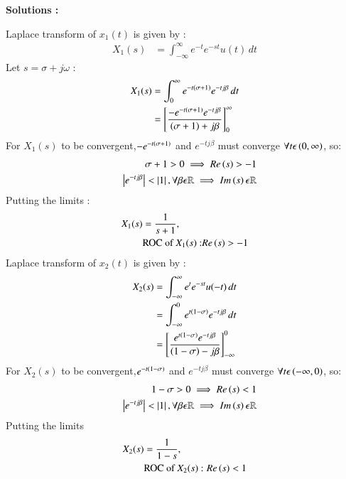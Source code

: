 \documentclass[journal,12pt,onecolumn]{IEEEtran}
\theoremstyle{remark}
\begin{document}
\textbf{Solutions :}
    
Laplace transform of $x_1(t)$ is given by :
\begin{align}
    X_1(s) &=  \int_{-\infty}^{\infty} e^{-t}e^{-st}u(t) \,dt
    \end{align}
    Let $s=\sigma+j\omega$ :
\begin{align}
 X_1(s) &= \int_{0}^{\infty}e^{-t\left(\sigma+1\right)}e^{-tj\beta} \,dt\\
       &=  \left[\frac{-e^{-t\left(\sigma+1\right)}e^{-tj\beta}}{\left(\sigma+1\right)+j\beta}\right]_{0}^{\infty}  \\
       \end{align}
        For $X_1(s)$ to be convergent,$-e^{-t\left(\sigma+1\right)}$ and $e^{-tj\beta}$ must converge $\forall t \epsilon \left(0,\infty\right)$, so:
        \begin{align}
\sigma + 1 > 0 \implies  Re\left(s\right)>-1 \\  \quad\left\vert e^{-tj\beta}\right\vert < \left\vert1\right\vert, \forall \beta \epsilon \mathbb{R} \implies Im\left(s\right) \epsilon \mathbb{R}
        \end{align}
Putting the limits :
       \begin{align}
X_1(s)&= \frac{1}{s+1} , \\ &\text{ROC of $X_1(s)$ :} Re\left(s\right) > -1
\end{align}
Laplace transform of $x_2(t)$ is given by :
\begin{align}
    X_2(s) &=  \int_{-\infty}^{\infty} e^{t}e^{-st}u(-t) \,dt\\
    &= \int_{-\infty}^{0}e^{t\left(1-\sigma\right)}e^{-tj\beta} \,dt\\
      &=  \left[\frac{e^{t\left(1-\sigma\right)}e^{-tj\beta}}{\left(1-\sigma\right)-j\beta}\right]_{-\infty}^{0}  
     \end{align}
      For $X_2(s)$ to be convergent,$e^{-t\left(1-\sigma\right)}$ and $e^{-tj\beta}$ must converge $\forall t\epsilon\left(-\infty,0\right)$, so:
     \begin{align}
1-\sigma > 0 \implies  Re\left(s\right) < 1 \\  \quad\left\vert e^{-tj\beta}\right\vert < \left\vert1\right\vert, \forall \beta \epsilon \mathbb{R} \implies Im\left(s\right) \epsilon \mathbb{R}
        \end{align}
Putting the limits 
     \begin{align}
            X_2(s)&= \frac{1}{1-s} , \\ &\text{ROC of $X_2(s)$ : }Re\left(s\right) < 1
\end{align}
\\
\end{document}
